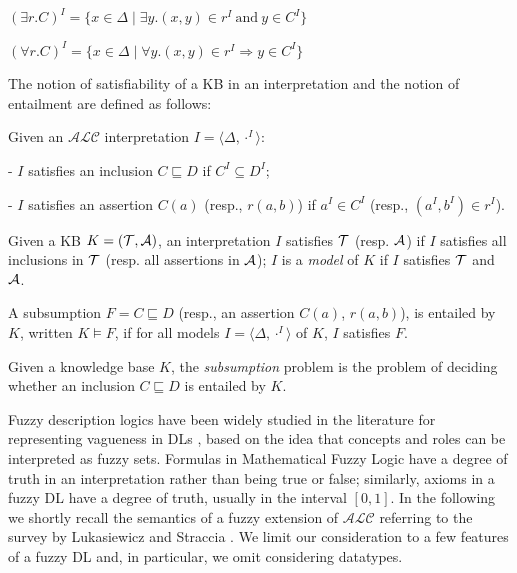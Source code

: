 \documentclass[runningheads]{llncs}
\newcommand {\sx} {\langle}
\newcommand {\dx} {\rangle}
\newcommand {\tc} {\mid}
\newcommand{\alc}{\mathcal{ALC}}
\newcommand {\Ri} {\Rightarrow}
\def \Ri{\Rightarrow}
\begin{document}
$(\exists r.C)^I =\{x \in \Delta \tc \exists y.(x,y) \in r^I \ \mbox{and}  \ y \in C^I\}$   \ \ \ \ \ \ \ 

$(\forall r.C)^I =\{x \in \Delta \tc \forall y. (x,y) \in r^I \Ri y \in C^I\}$   \ \ \ \ \ \ \ \ \ 


\noindent
The notion of satisfiability of a KB  in an interpretation and the notion of entailment are defined as follows:

\begin{definition} \label{satisfiability}
Given an $\alc$ interpretation $I=\langle \Delta, \cdot^I \rangle$: 

	- $I$  satisfies an inclusion $C \sqsubseteq D$ if   $C^I \subseteq D^I$;
	
	-   $I$ satisfies an assertion $C(a)$ (resp., $r(a,b)$) if $a^I \in C^I$ (resp.,  $(a^I,b^I) \in r^I$).
	

\noindent
 Given  a KB $K=({\cal T}, {\cal A})$, 
 an interpretation $I$  satisfies ${\cal T}$ (resp. ${\cal A}$) if $I$ satisfies all  inclusions in ${\cal T}$ (resp. all assertions in ${\cal A}$);
 $I$ is a \emph{model} of $K$ if $I$ satisfies ${\cal T}$ and ${\cal A}$.

 A subsumption $F= C \sqsubseteq D$ (resp., an assertion $C(a)$, $r(a,b)$),   {is entailed by $K$}, written $K \models F$, if for all models $I=$$\sx \Delta,  \cdot^I\dx$ of $K$,
$I$ satisfies $F$.

\end{definition}
Given a knowledge base $K$,
the {\em subsumption} problem is the problem of deciding whether an inclusion $C \sqsubseteq D$ is entailed by  $K$.

 

Fuzzy description logics have been widely studied in the literature for representing vagueness in DLs \cite{Straccia05,Stoilos05,LukasiewiczStraccia09,PenalosaARTINT15,BobilloOWL2EL2018}, 
based on the idea that concepts and roles can be interpreted 
as fuzzy sets. 
%
Formulas in Mathematical Fuzzy Logic \cite{Cintula2011} have a degree of truth in an interpretation rather than being true or false; similarly,
axioms in a fuzzy DL have a degree of truth, usually in the interval  $[0, 1]$. 
%
In the following we shortly recall the semantics of a fuzzy extension of $\alc$ referring to the survey by Lukasiewicz and Straccia \cite{LukasiewiczStraccia09}.
%
We limit our consideration  to a few features of a fuzzy DL  and, in particular, we omit considering datatypes.
\end{document}
